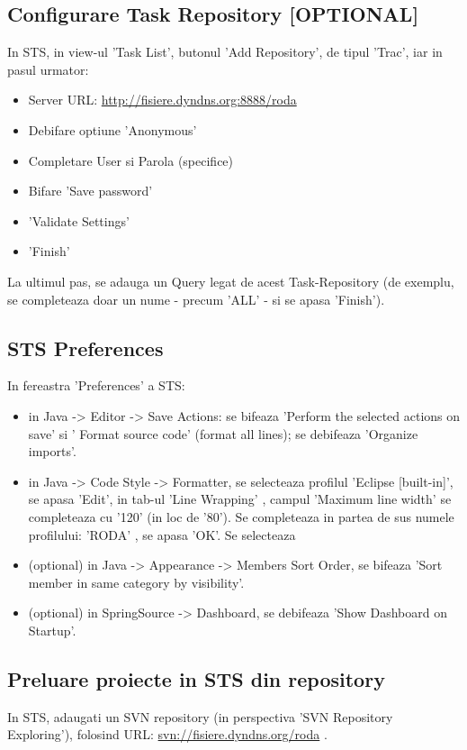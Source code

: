 \subsection{Configurare Task Repository [OPTIONAL]}
In STS, in view-ul 'Task List', butonul 'Add Repository', de tipul 'Trac', 
iar in pasul urmator:
\begin{itemize}
\item 
Server URL:    \url{http://fisiere.dyndns.org:8888/roda}
\item
Debifare optiune 'Anonymous'
\item
Completare User si Parola (specifice)
\item
Bifare 'Save password'
\item
'Validate Settings'
\item
'Finish'
\end{itemize}

La ultimul pas, se adauga un Query legat de acest Task-Repository (de exemplu,
se completeaza doar un nume - precum 'ALL' - si se apasa 'Finish').

\subsection{STS Preferences}
In fereastra 'Preferences' a STS:
\begin{itemize}
\item
in Java -> Editor -> Save Actions: se bifeaza 'Perform the selected actions on save' si ' Format source code' (format all lines); se debifeaza 'Organize imports'.
\item
in Java -> Code Style -> Formatter, se selecteaza profilul 'Eclipse [built-in]', se apasa 'Edit', in tab-ul 'Line Wrapping' , campul 'Maximum line width' se completeaza cu '120' (in loc de '80').
Se completeaza in partea de sus numele profilului: 'RODA' , se apasa 'OK'. Se selecteaza
\item
(optional) in Java -> Appearance -> Members Sort Order, se bifeaza 'Sort member in same category by visibility'.
\item
(optional) in SpringSource -> Dashboard, se debifeaza 'Show Dashboard on Startup'.
\end{itemize}

\subsection{Preluare proiecte in STS din repository}
In STS, adaugati un SVN repository 
(in perspectiva 'SVN Repository Exploring'), 
folosind URL: \url{svn://fisiere.dyndns.org/roda} .

